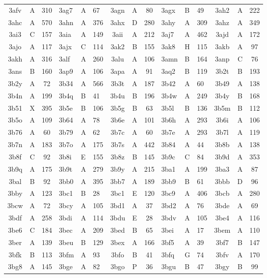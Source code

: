 \begin{longtable}{|c|c|c| a|a|a| c|c|c| a|a|a| c|c|c|}
3afv & A & 310 & 3ag7 & A & 67 & 3agn & A & 80 & 3agx & B & 49 & 3ah2 & A & 222\\
3ahc & A & 570 & 3ahn & A & 376 & 3ahx & D & 280 & 3ahy & A & 309 & 3ahz & A & 349\\
3ai3 & C & 157 & 3aia & A & 149 & 3aii & A & 212 & 3aj7 & A & 462 & 3ajd & A & 172\\
3ajo & A & 117 & 3ajx & C & 114 & 3ak2 & B & 155 & 3ak8 & H & 115 & 3akb & A & 97\\
3akh & A & 316 & 3alf & A & 260 & 3alu & A & 106 & 3amn & B & 164 & 3anp & C & 76\\
3ans & B & 160 & 3ap9 & A & 106 & 3apa & A & 91 & 3aq2 & B & 119 & 3b2t & B & 193\\
3b2y & A & 72 & 3b34 & A & 566 & 3b3t & A & 187 & 3b42 & A & 60 & 3b49 & A & 138\\
3b4n & A & 199 & 3b4q & B & 41 & 3b4u & B & 196 & 3b4w & A & 249 & 3b4y & B & 168\\
3b51 & X & 395 & 3b5e & B & 106 & 3b5g & B & 63 & 3b5l & B & 136 & 3b5m & B & 112\\
3b5o & A & 109 & 3b64 & A & 78 & 3b6e & A & 101 & 3b6h & A & 293 & 3b6i & A & 106\\
3b76 & A & 60 & 3b79 & A & 62 & 3b7c & A & 60 & 3b7e & A & 293 & 3b7l & A & 119\\
3b7n & A & 183 & 3b7o & A & 175 & 3b7s & A & 442 & 3b84 & A & 44 & 3b8b & A & 138\\
3b8f & C & 92 & 3b8i & E & 155 & 3b8z & B & 145 & 3b9c & C & 84 & 3b9d & A & 353\\
3b9q & A & 175 & 3b9t & A & 279 & 3b9y & A & 215 & 3ba1 & A & 199 & 3ba3 & A & 87\\
3bal & B & 92 & 3bb0 & A & 395 & 3bb7 & A & 189 & 3bb9 & B & 61 & 3bbb & D & 96\\
3bby & A & 123 & 3bc1 & B & 28 & 3bc1 & E & 120 & 3bc9 & A & 406 & 3bcb & A & 280\\
3bcw & A & 72 & 3bcy & A & 105 & 3bd1 & A & 37 & 3bd2 & A & 76 & 3bde & A & 69\\
3bdf & A & 258 & 3bdi & A & 114 & 3bdu & E & 28 & 3bdv & A & 105 & 3be4 & A & 116\\
3be6 & C & 184 & 3bec & A & 209 & 3bed & B & 65 & 3bei & A & 17 & 3bem & A & 110\\
3ber & A & 139 & 3beu & B & 129 & 3bex & A & 166 & 3bf5 & A & 39 & 3bf7 & B & 147\\
3bfk & B & 113 & 3bfm & A & 93 & 3bfo & B & 41 & 3bfq & G & 74 & 3bfv & A & 170\\
3bg8 & A & 145 & 3bge & A & 82 & 3bgo & P & 36 & 3bgu & B & 47 & 3bgy & B & 99\\

\end{longtable}
